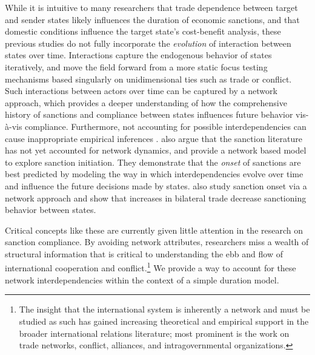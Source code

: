 While it is intuitive to many researchers that trade dependence between target and sender states likely influences the duration of economic sanctions, and that domestic conditions influence the target state's cost-benefit analysis, these previous studies do not fully incorporate the \textit{evolution} of interaction between states over time. Interactions capture the endogenous behavior of states iteratively, and move the field forward from a more static focus testing mechanisms based singularly on unidimensional ties such as trade or conflict. Such interactions between actors over time can be captured by a network approach, which provides a deeper understanding of how the comprehensive history of sanctions and compliance between states influences future behavior vis-\`a-vis compliance. Furthermore, not accounting for possible interdependencies can cause inappropriate empirical inferences \citep{erikson2014dyadic}. \citet{cranmer2014reciprocity} also argue that the sanction literature has not yet accounted for network dynamics, and provide a network based model to explore sanction initiation. They demonstrate that the \textit{onset} of sanctions are best predicted by modeling the way in which interdependencies evolve over time and influence the future decisions made by states. \citet{hafner2008} also study sanction onset via a network approach and show that increases in bilateral trade decrease sanctioning behavior between states.

Critical concepts like these are currently given little attention in the research on sanction compliance. By avoiding network attributes, researchers miss a wealth of structural information that is critical to understanding the ebb and flow of international cooperation and conflict.\footnote{The insight that the international system is inherently a network and must be studied as such has gained increasing theoretical and empirical support in the broader international relations literature; most prominent is the work on trade networks,\cite{hoff2004modeling, ward:rainbow:2013} conflict,\cite{ward2007disputes} alliances,\cite{warren2010geometry} and intragovernmental organizations.\cite{cao2009networks,greenhill2010norm}} We provide a way to account for these network interdependencies within the context of a simple duration model.

